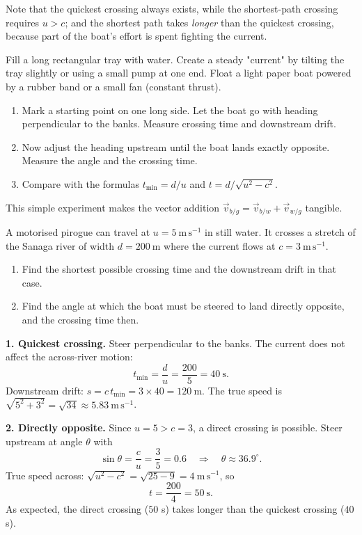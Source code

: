 \documentclass[11pt]{article}
\begin{document}
Note that the quickest crossing always exists, while the shortest-path crossing requires $u > c$; and the shortest path takes \emph{longer} than the quickest crossing, because part of the boat's effort is spent fighting the current.

\begin{experience}
Fill a long rectangular tray with water. Create a steady "current" by tilting the tray slightly or using a small pump at one end. Float a light paper boat powered by a rubber band or a small fan (constant thrust). 
\begin{enumerate}
\item Mark a starting point on one long side. Let the boat go with heading perpendicular to the banks. Measure crossing time and downstream drift.
\item Now adjust the heading upstream until the boat lands exactly opposite. Measure the angle and the crossing time.
\item Compare with the formulas $t_{\min}=d/u$ and $t=d/\sqrt{u^2-c^2}$.
\end{enumerate}
This simple experiment makes the vector addition $\vec{v}_{b/g}=\vec{v}_{b/w}+\vec{v}_{w/g}$ tangible.
\end{experience}

\begin{exoresolu}
A motorised pirogue can travel at $u = 5\ \mathrm{m\,s^{-1}}$ in still water. It crosses a stretch of the Sanaga river of width $d = 200\ \mathrm{m}$ where the current flows at $c = 3\ \mathrm{m\,s^{-1}}$.
\begin{enumerate}
\item Find the shortest possible crossing time and the downstream drift in that case.
\item Find the angle at which the boat must be steered to land directly opposite, and the crossing time then.
\end{enumerate}
\tcblower
\textbf{1. Quickest crossing.} Steer perpendicular to the banks. The current does not affect the across-river motion:
\[
t_{\min} = \frac{d}{u} = \frac{200}{5} = 40\ \mathrm{s}.
\]
Downstream drift: $s = c\,t_{\min} = 3 \times 40 = 120\ \mathrm{m}$. The true speed is $\sqrt{5^2+3^2} = \sqrt{34} \approx 5.83\ \mathrm{m\,s^{-1}}$.

\textbf{2. Directly opposite.} Since $u = 5 > c = 3$, a direct crossing is possible. Steer upstream at angle $\theta$ with
\[
\sin\theta = \frac{c}{u} = \frac{3}{5} = 0.6 \quad\Longrightarrow\quad \theta \approx 36.9^\circ.
\]
True speed across: $\sqrt{u^2 - c^2} = \sqrt{25-9} = 4\ \mathrm{m\,s^{-1}}$, so
\[
t = \frac{200}{4} = 50\ \mathrm{s}.
\]
As expected, the direct crossing ($50$ s) takes longer than the quickest crossing ($40$ s).
\end{exoresolu}
\end{document}

